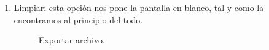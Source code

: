 \begin{enumerate}
\begin{enumerate}
            \item Limpiar: esta opción nos pone la pantalla en blanco, tal y como la encontramos al principio del todo.           
             \begin{figure}[H]
                \caption{Exportar archivo.} \label{fig:incre}
                
            \end{figure} 
            

\end{enumerate}
\end{enumerate}
